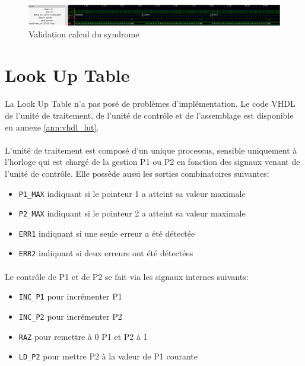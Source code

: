 \documentclass[a4paper, 11pt, svgnames]{report}
\begin{document}
            \begin{figure}[H]
                \centering
                \includegraphics[width=\textwidth]{./images/syndrome_simu.png}
                \caption{Validation calcul du syndrome}
                \label{fig:sim_syndrome}
            \end{figure}

        \section{Look Up Table}
            \paragraph{}
                La Look Up Table n'a pas posé de problèmes d'implémentation. Le
                code VHDL de l'unité de traitement, de l'unité de contrôle et
                de l'assemblage est disponible en annexe \ref{ann:vhdl_lut}.

            \paragraph{}
                L'unité de traitement est composé d'un unique processus, sensible
                uniquement à l'horloge qui est chargé de la gestion P1 ou P2 en
                fonction des signaux venant de l'unité de contrôle.
                Elle possède aussi les sorties combinatoires suivantes:
                \begin{itemize}
                    \item \verb|P1_MAX| indiquant si le pointeur 1 a atteint sa valeur maximale
                    \item \verb|P2_MAX| indiquant si le pointeur 2 a atteint sa valeur maximale
                    \item \verb|ERR1| indiquant si une seule erreur a été détectée
                    \item \verb|ERR2| indiquant si deux erreurs ont été détectées
                \end{itemize}

            \paragraph{}
                Le contrôle de P1 et de P2 se fait via les signaux internes suivants:
                \begin{itemize}
                    \item \verb|INC_P1| pour incrémenter P1
                    \item \verb|INC_P2| pour incrémenter P2
                    \item \verb|RAZ| pour remettre à 0 P1 et P2 à 1
                    \item \verb|LD_P2| pour mettre P2 à la valeur de P1 courante
                \end{itemize}
\end{document}
